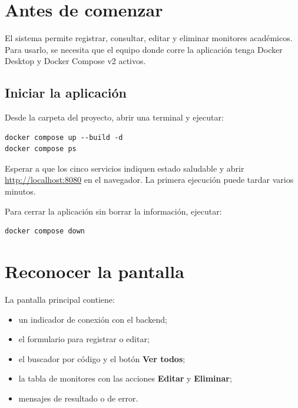 



\tableofcontents
\clearpage
{}

\section{Antes de comenzar}

El sistema permite registrar, consultar, editar y eliminar monitores académicos. Para usarlo, se necesita que el equipo donde corre la aplicación tenga Docker Desktop y Docker Compose v2 activos.

\subsection{Iniciar la aplicación}

Desde la carpeta del proyecto, abrir una terminal y ejecutar:

\begin{lstlisting}
docker compose up --build -d
docker compose ps
\end{lstlisting}

Esperar a que los cinco servicios indiquen estado saludable y abrir \url{http://localhost:8080} en el navegador. La primera ejecución puede tardar varios minutos.

Para cerrar la aplicación sin borrar la información, ejecutar:

\begin{lstlisting}
docker compose down
\end{lstlisting}

\section{Reconocer la pantalla}

La pantalla principal contiene:
\begin{itemize}
  \item un indicador de conexión con el backend;
  \item el formulario para registrar o editar;
  \item el buscador por código y el botón \textbf{Ver todos};
  \item la tabla de monitores con las acciones \textbf{Editar} y \textbf{Eliminar};
  \item mensajes de resultado o de error.
\end{itemize}

